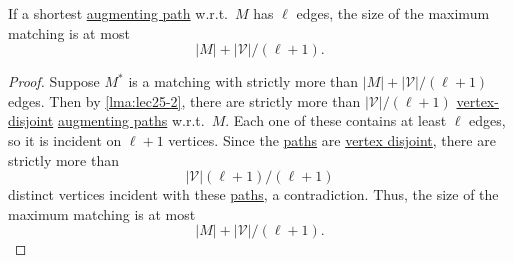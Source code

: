 \begin{lemma}\label{lma:lec25-5}
	If a shortest \hyperref[def:augmenting-path]{augmenting path} w.r.t.\ \(M\) has \(\ell \) edges, the size of the maximum matching is at most
	\[
		\left\vert M \right\vert + \left\vert \mathcal{V}  \right\vert / (\ell +1).
	\]
\end{lemma}
\begin{proof}
	Suppose \(M^{\ast} \) is a matching with strictly more than \(\left\vert M \right\vert + \left\vert \mathcal{V}  \right\vert / (\ell +1)\) edges. Then by \autoref{lma:lec25-2}, there are strictly more than \(\left\vert \mathcal{V}  \right\vert / (\ell +1)\) \hyperref[def:vertex-independent]{vertex-disjoint} \hyperref[def:augmenting-path]{augmenting paths} w.r.t.\ \(M\). Each one of these contains at least \(\ell \) edges, so it is incident on \(\ell +1\) vertices. Since the \hyperref[def:path]{paths} are \hyperref[def:vertex-independent]{vertex disjoint}, there are strictly more than
	\[
		\left\vert \mathcal{V}  \right\vert (\ell + 1) / (\ell +1)
	\]
	distinct vertices incident with these \hyperref[def:path]{paths}, a contradiction. Thus, the size of the maximum matching is at most
	\[
		\left\vert M \right\vert + \left\vert \mathcal{V}  \right\vert / (\ell +1).
	\]
\end{proof}

